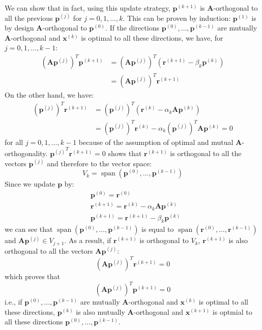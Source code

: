 \documentclass{article}
\DeclareMathOperator{\spn}{span}
\begin{document}
We can show that in fact, using this update strategy, $\mathbf{p}^{(k+1)}$ is $\mathbf{A}$-orthogonal
to all the previous $\mathbf{p}^{(j)}$ for $j = 0,1,\dots,k$.
This can be proven by induction: 
$\mathbf{p}^{(1)}$ is by design $\mathbf{A}$-orthogonal to $\mathbf{p}^{(0)}$. 
If the directions $\mathbf{p}^{(0)}, \dots, \mathbf{p}^{(k-1)}$ are mutually $\mathbf{A}$-orthogonal
and $\mathbf{x}^{(k)}$ is optimal to all these directions, we have, for 
$j = 0, 1, \dots, k-1$:
\begin{align*}
    \left(\mathbf{A} \mathbf{p}^{(j)} \right)^T \mathbf{p}^{(k+1)} 
    &= \left(\mathbf{A} \mathbf{p}^{(j)} \right)^T 
            \left( \mathbf{r}^{(k+1)} - \beta_k \mathbf{p}^{(k)} \right) \\ 
    &= \left(\mathbf{A} \mathbf{p}^{(j)} \right)^T \mathbf{r}^{(k+1)} 
\end{align*}
On the other hand, we have:
\begin{align*}
    \left(\mathbf{p}^{(j)} \right)^T \mathbf{r}^{(k+1)} 
    &= \left(\mathbf{p}^{(j)} \right)^T 
        \left( \mathbf{r}^{(k)} - \alpha_k \mathbf{A}\mathbf{p}^{(k)}\right)  \\
    &= \left(\mathbf{p}^{(j)} \right)^T \mathbf{r}^{(k)} 
       - \alpha_k  \left(\mathbf{p}^{(j)} \right)^T \mathbf{A}\mathbf{p}^{(k)} = 0
\end{align*}
for all $j = 0, 1, \dots, k-1$ because of the assumption of optimal and mutual $\mathbf{A}$-orthogonality.
$\left.\mathbf{p}^{(j)} \right.^T \mathbf{r}^{(k+1)} = 0$ shows that $\mathbf{r}^{(k+1)}$ is 
orthogonal to all the vectors $\mathbf{p}^{(j)}$ and therefore to the vector space:
\begin{equation}
    V_k = \spn(\mathbf{p}^{(0)}, \dots, \mathbf{p}^{(k-1)})
\end{equation} 
Since we update $\mathbf{p}$ by:
\begin{align*}
    & \mathbf{p}^{(0)} = \mathbf{r}^{(0)} \\
    & \mathbf{r}^{(k+1)} = \mathbf{r}^{(k)} - \alpha_k \mathbf{A}\mathbf{p}^{(k)} \\
    & \mathbf{p}^{(k+1)} = \mathbf{r}^{(k+1)} - \beta_k \mathbf{p}^{(k)}
\end{align*}
we can see that $\spn(\mathbf{p}^{(0)}, \dots, \mathbf{p}^{(k-1)})$ is equal to 
$\spn(\mathbf{r}^{(0)}, \dots, \mathbf{r}^{(k-1)})$ and $\mathbf{A}\mathbf{p}^{(j)} \in V_{j+1}$.
As a result, if $\mathbf{r}^{(k+1)}$ is orthogonal to $V_k$, 
$\mathbf{r}^{(k+1)}$ is also orthogonal to all the vectors $\mathbf{A} \mathbf{p}^{(j)}$:
\begin{equation*}
    \left(\mathbf{A} \mathbf{p}^{(j)} \right)^T \mathbf{r}^{(k+1)} = 0
\end{equation*}
which proves that 
\begin{equation*}
    \left(\mathbf{A} \mathbf{p}^{(j)} \right)^T \mathbf{p}^{(k+1)} = 0
\end{equation*}
i.e., if $\mathbf{p}^{(0)}, \dots, \mathbf{p}^{(k-1)}$ are mutually $\mathbf{A}$-orthogonal
and $\mathbf{x}^{(k)}$ is optimal to all these directions, $\mathbf{p}^{(k)}$ is also mutually
$\mathbf{A}$-orthogonal and $\mathbf{x}^{(k+1)}$ is optmial to all these directions
$\mathbf{p}^{(0)}, \dots, \mathbf{p}^{(k-1)}$.
\end{document}
